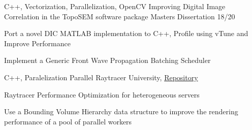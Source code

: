 
\begin{cventries}


\cventry
{C++, Vectorization, Parallelization, OpenCV} %
  {Improving Digital Image Correlation in the TopoSEM software package} %
{Masters Dissertation} %
{18/20} %
{ %
\begin{cvitems}
\item {Port a novel DIC MATLAB implementation to C++, Profile using vTune and Improve Performance}
\item {Implement a Generic Front Wave Propagation Batching Scheduler}
\end{cvitems}
}




\cventry
{C++, Paralelization} %
{Parallel Raytracer} %
{University, \href{https://github.com/JoseFilipeFerreira/parallel-raytracer}{Repository}} %
{} %
{ %
\begin{cvitems}
\item{Raytracer Performance Optimization for heterogeneous servers}
\item{Use a Bounding Volume Hierarchy data structure to improve the rendering performance of a pool of parallel workers}
\end{cvitems}
}




\end{cventries}
